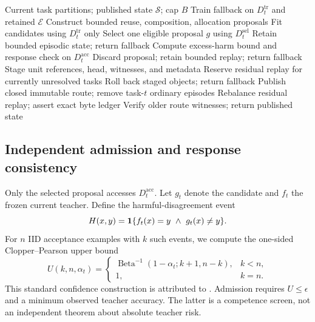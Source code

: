 \documentclass{article}
\begin{document}
\begin{algorithm}[t]
\caption{One task-boundary transaction}
\label{alg:famp}
\begin{algorithmic}[1]
\REQUIRE Current task partitions; published state $\mathcal S$; cap $B$
\STATE Train fallback on $D_t^{\mathrm{tr}}$ and retained $\mathcal E$
\STATE Construct bounded reuse, composition, allocation proposals
\STATE Fit candidates using $D_t^{\mathrm{tr}}$ only
\STATE Select one eligible proposal $g$ using $D_t^{\mathrm{sel}}$
\STATE Retain bounded episodic state; return fallback
\ENDIF
\STATE Compute excess-harm bound and response check on $D_t^{\mathrm{acc}}$
\STATE Discard proposal; retain bounded replay; return fallback
\ENDIF
\STATE Stage unit references, head, witnesses, and metadata
\STATE Reserve residual replay for currently unresolved tasks
\STATE Roll back staged objects; return fallback
\ENDIF
\STATE Publish closed immutable route; remove task-$t$ ordinary episodes
\STATE Rebalance residual replay; assert exact byte ledger
\STATE Verify older route witnesses; return published state
\end{algorithmic}
\end{algorithm}

\subsection{Independent admission and response consistency}
Only the selected proposal accesses $D_t^{\mathrm{acc}}$. Let $g_t$ denote the candidate and $f_t$ the frozen current teacher. Define the harmful-disagreement event
\begin{equation}
H(x,y)=\mathbf{1}\{f_t(x)=y\ \land\ g_t(x)\ne y\}.
\label{eq:harm}
\end{equation}
For $n$ IID acceptance examples with $k$ such events, we compute the one-sided Clopper--Pearson upper bound
\begin{equation}
U(k,n,\alpha_t)=
\begin{cases}
\operatorname{Beta}^{-1}(1-\alpha_t;k+1,n-k),&k<n,\\
1,&k=n.
\end{cases}
\label{eq:cp}
\end{equation}
This standard confidence construction is attributed to \citet{clopper1934}. Admission requires $U\le\epsilon$ and a minimum observed teacher accuracy. The latter is a competence screen, not an independent theorem about absolute teacher risk.
\end{document}
